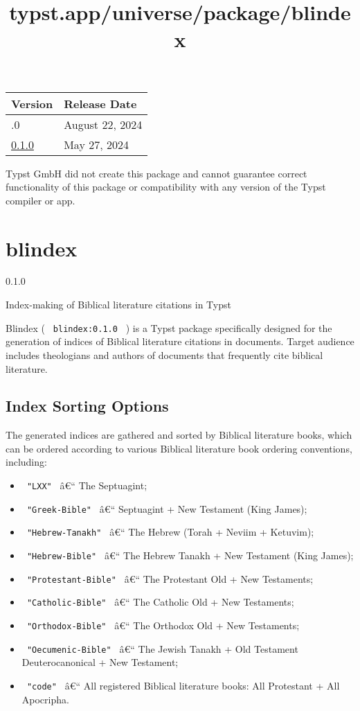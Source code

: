 \begin{longtable}[]{@{}ll@{}}
\toprule\noalign{}
Version & Release Date \\
\midrule\noalign{}
\endhead
\bottomrule\noalign{}
\endlastfoot
0.2.0 & August 22, 2024 \\
\href{https://typst.app/universe/package/pillar/0.1.0/}{0.1.0} & May 27,
2024 \\
\end{longtable}

Typst GmbH did not create this package and cannot guarantee correct
functionality of this package or compatibility with any version of the
Typst compiler or app.


\title{typst.app/universe/package/blindex}

\label{banner}
\section{blindex}\label{blindex}

{ 0.1.0 }

Index-making of Biblical literature citations in Typst

\label{readme}
Blindex ( \texttt{\ blindex:0.1.0\ } ) is a Typst package specifically
designed for the generation of indices of Biblical literature citations
in documents. Target audience includes theologians and authors of
documents that frequently cite biblical literature.

\subsection{Index Sorting Options}\label{index-sorting-options}

The generated indices are gathered and sorted by Biblical literature
books, which can be ordered according to various Biblical literature
book ordering conventions, including:

\begin{itemize}
\tightlist
\item
  \texttt{\ "LXX"\ } â€`` The Septuagint;
\item
  \texttt{\ "Greek-Bible"\ } â€`` Septuagint + New Testament (King
  James);
\item
  \texttt{\ "Hebrew-Tanakh"\ } â€`` The Hebrew (Torah + Neviim +
  Ketuvim);
\item
  \texttt{\ "Hebrew-Bible"\ } â€`` The Hebrew Tanakh + New Testament
  (King James);
\item
  \texttt{\ "Protestant-Bible"\ } â€`` The Protestant Old + New
  Testaments;
\item
  \texttt{\ "Catholic-Bible"\ } â€`` The Catholic Old + New Testaments;
\item
  \texttt{\ "Orthodox-Bible"\ } â€`` The Orthodox Old + New Testaments;
\item
  \texttt{\ "Oecumenic-Bible"\ } â€`` The Jewish Tanakh + Old Testament
  Deuterocanonical + New Testament;
\item
  \texttt{\ "code"\ } â€`` All registered Biblical literature books: All
  Protestant + All Apocripha.
\end{itemize}

